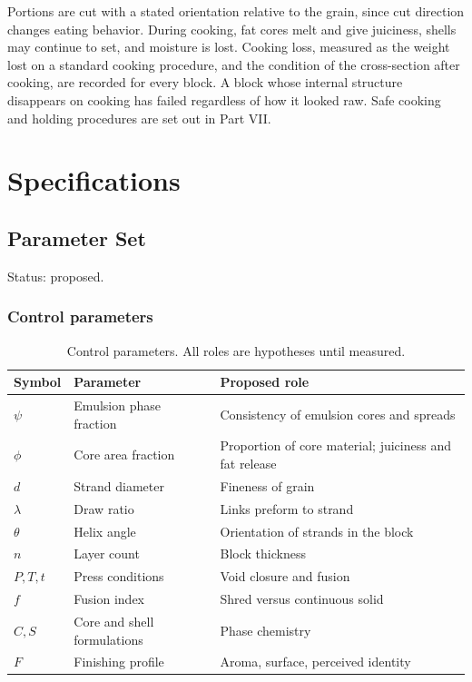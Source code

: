 \documentclass[11pt,openany]{book}
\theoremstyle{definition}
\begin{document}
Portions are cut with a stated orientation relative to the grain, since cut direction changes eating behavior. During cooking, fat cores melt and give juiciness, shells may continue to set, and moisture is lost. Cooking loss, measured as the weight lost on a standard cooking procedure, and the condition of the cross-section after cooking, are recorded for every block. A block whose internal structure disappears on cooking has failed regardless of how it looked raw. Safe cooking and holding procedures are set out in Part VII.

\part{Specifications}

\chapter{Parameter Set}\label{ch:params}

Status: proposed.

\section{Control parameters}

\begin{table}[h]
\centering
\begin{tabularx}{\linewidth}{@{}llX@{}}
\toprule
Symbol & Parameter & Proposed role \\
\midrule
$\psi$ & Emulsion phase fraction & Consistency of emulsion cores and spreads \\
$\phi$ & Core area fraction & Proportion of core material; juiciness and fat release \\
$d$ & Strand diameter & Fineness of grain \\
$\lambda$ & Draw ratio & Links preform to strand \\
$\theta$ & Helix angle & Orientation of strands in the block \\
$n$ & Layer count & Block thickness \\
$P,T,t$ & Press conditions & Void closure and fusion \\
$f$ & Fusion index & Shred versus continuous solid \\
$C,S$ & Core and shell formulations & Phase chemistry \\
$F$ & Finishing profile & Aroma, surface, perceived identity \\
\bottomrule
\end{tabularx}
\caption{Control parameters. All roles are hypotheses until measured.}
\end{table}
\end{document}
